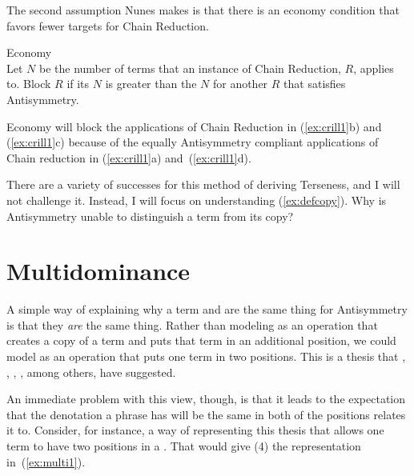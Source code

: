 \documentclass[output=paper]{langsci/langscibook}
\begin{document}
The second assumption Nunes makes is that there is an economy condition that favors fewer targets for Chain Reduction.
\begin{exe}
	\ex \label{ex:econ} Economy\\
	Let $N$ be the number of terms that an instance of Chain Reduction, $R$, applies to. Block $R$ if its $N$ is greater than the $N$ for another $R$ that satisfies Antisymmetry.
\end{exe}

Economy will block the applications of Chain Reduction in (\ref{ex:crill1}b) and (\ref{ex:crill1}c) because of the equally Antisymmetry compliant applications of Chain reduction in (\ref{ex:crill1}a) and~(\ref{ex:crill1}d).

There are a variety of successes for this method of deriving Terseness, and I
will not challenge it. Instead, I will focus on understanding
(\ref{ex:defcopy}). Why is Antisymmetry unable to distinguish a term from its
copy?


\section{Multidominance} %
\label{sec:multidominance}

A simple way of explaining why a term and  are the same thing for Antisymmetry
is that they \emph{are} the same thing. Rather than modeling  as an
operation that creates a copy of a term and puts
that term in an additional position, we could model  as an operation
that puts one term in two positions. This is a thesis that \citet{Engdahl1980},
\citet{Starke2001}, \citet{deVries2007}, \citet{Gartner2002}, among others,
have suggested.

An immediate problem with this view, though, is that it leads to the
expectation that the denotation a phrase has will be the same in both of the
positions  relates it to. Consider, for instance, a way of representing
this thesis that allows one term to have two positions in a . That
would give (4) the representation in~(\ref{ex:multi1}).\largerpage
\end{document}
